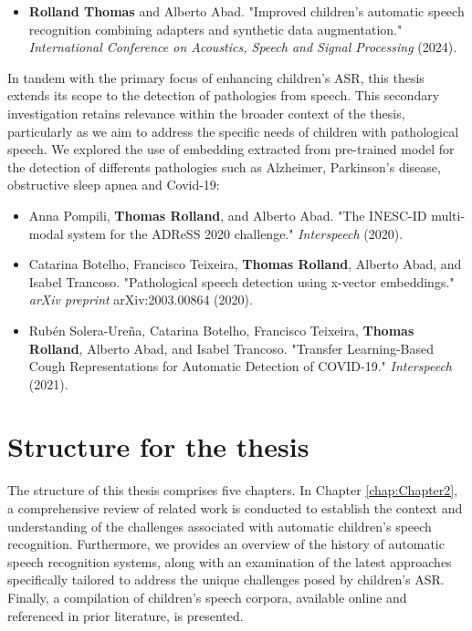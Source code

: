 \begin{itemize}
    \item \textbf{Rolland Thomas} and Alberto Abad. "Improved children’s automatic speech recognition combining adapters and synthetic data augmentation." \textit{International Conference on Acoustics, Speech and Signal Processing} (2024).
\end{itemize}

In tandem with the primary focus of enhancing children's ASR, this thesis extends its scope to the detection of pathologies from speech. This secondary investigation retains relevance within the broader context of the thesis, particularly as we aim to address the specific needs of children with pathological speech. We explored the use of embedding extracted from pre-trained model for the detection of differents pathologies such as Alzheimer, Parkinson's disease, obstructive sleep apnea and Covid-19:

\begin{itemize}
    \item Anna Pompili, \textbf{Thomas Rolland}, and Alberto Abad. "The INESC-ID multi-modal system for the ADReSS 2020 challenge." \textit{Interspeech} (2020).
    \item Catarina Botelho, Francisco Teixeira, \textbf{Thomas Rolland}, Alberto Abad, and Isabel Trancoso. "Pathological speech detection using x-vector embeddings." \textit{arXiv preprint} arXiv:2003.00864 (2020).
    \item Rubén Solera-Ureña, Catarina Botelho, Francisco Teixeira, \textbf{Thomas Rolland}, Alberto Abad, and Isabel Trancoso. "Transfer Learning-Based Cough Representations for Automatic Detection of COVID-19." \textit{Interspeech} (2021).
\end{itemize}


\section{Structure for the thesis}
The structure of this thesis comprises five chapters. In Chapter \ref{chap:Chapter2}, a comprehensive review of related work is conducted to establish the context and understanding of the challenges associated with automatic children's speech recognition. Furthermore, we provides an overview of the history of automatic speech recognition systems, along with an examination of the latest approaches specifically tailored to address the unique challenges posed by children's ASR. Finally, a compilation of children's speech corpora, available online and referenced in prior literature, is presented.

